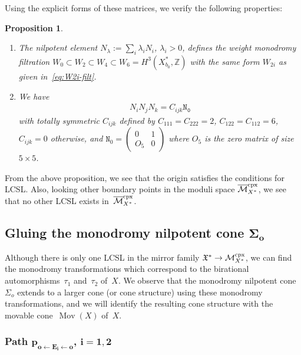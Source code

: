 \documentclass[10pt,a4paper]{amsart}
\numberwithin{equation}{section}
\newtheorem{Proposition}[Theorem]{Proposition}
\begin{document}
Using the explicit forms of these matrices, we verify the following properties:
\begin{Proposition}\quad
\begin{enumerate}\itemsep=0pt \item[{\rm (1)}] The nilpotent element $N_{\lambda}:=\sum_{i}\lambda_{i}N_{i}$, $\lambda_{i}>0$, defines the weight monodromy filtration $W_{0}\subset W_{2}\subset W_{4}\subset W_{6}=H^{3}(X_{b_{0}}^{*},\mathbb{Z})$ with the same form $W_{2i}$ as given in~\eqref{eq:W2i-filt}.

\item[{\rm (2)}] We have
\begin{gather*}
N_{i}N_{j}N_{k}=C_{ijk}\mathtt{N_{0}}
\end{gather*}
with totally symmetric $C_{ijk}$ defined by $C_{111}=C_{222}=2$, $C_{122}=C_{112}=6$, $C_{ijk}=0$ otherwise, and $\mathtt{N}_{0}=\left(\begin{smallmatrix}0 & 1\\
O_{5} & 0
\end{smallmatrix}\right)$ where $O_{5}$ is the zero matrix of size $5\times5$.
\end{enumerate}
\end{Proposition}

From the above proposition, we see that the origin satisfies the conditions for LCSL. Also, looking other boundary points in the moduli space
$\overline{\mathcal{M}}_{X^{*}}^{\rm cpx}$, we see that no other LCSL exists in~$\overline{\mathcal{M}}_{X^{*}}^{\rm cpx}$.

\subsection[Gluing the monodromy nilpotent cone $\Sigma_{o}$]{Gluing the monodromy nilpotent cone $\boldsymbol{\Sigma_{o}}$}

Although there is only one LCSL in the mirror family $\mathfrak{X}^{*}\to\mathcal{M}_{X^{*}}^{\rm cpx}$, we can find the monodromy transformations which correspond to the birational automorphisms~$\tau_{1}$ and~$\tau_{2}$ of~$X$. We observe that the monodromy nilpotent cone $\Sigma_{o}$ extends to a larger cone (or cone structure) using these monodromy transformations, and we will identify the resulting cone structure with the movable cone~$\operatorname{Mov}(X)$ of~$X$.

\subsubsection[Path $p_{o\leftarrow E_i\leftarrow o}$, $i=1,2$]{Path $\boldsymbol{p_{o\leftarrow E_i\leftarrow o}}$, $\boldsymbol{i=1,2}$}
\end{document}
